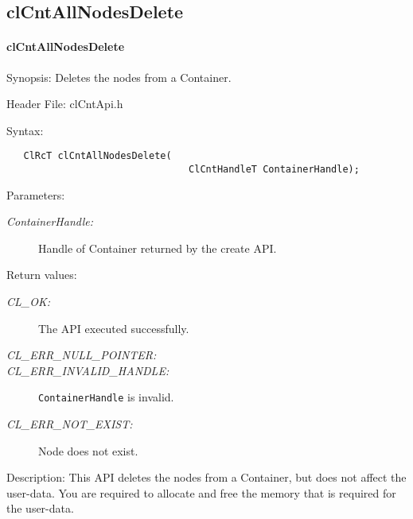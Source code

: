 \subsection{clCntAllNodesDelete}
\hypertarget{pagecnt106}{}\paragraph{cl\-Cnt\-All\-Nodes\-Delete}\label{pagecnt106}
\begin{Desc}
\item[Synopsis:]Deletes the nodes from a Container.\end{Desc}
\begin{Desc}
\item[Header File:]clCntApi.h\end{Desc}
\begin{Desc}
\item[Syntax:]

\footnotesize\begin{verbatim}   ClRcT clCntAllNodesDelete(
                        		ClCntHandleT ContainerHandle);
\end{verbatim}
\normalsize
\end{Desc}
\begin{Desc}
\item[Parameters:]
\begin{description}
\item[{\em Container\-Handle:}]Handle of Container returned by the create API.\end{description}
\end{Desc}
\begin{Desc}
\item[Return values:]
\begin{description}
\item[{\em CL\_\-OK:}]The API executed successfully. 
\item[{\em CL\_\-ERR\_\-NULL\_\-POINTER:}] 
\item[{\em CL\_\-ERR\_\-INVALID\_\-HANDLE:}] {\tt{ContainerHandle}} is invalid.
\item[{\em CL\_\-ERR\_\-NOT\_\-EXIST:}]Node does not exist.\end{description}
\end{Desc}
\begin{Desc}
\item[Description:]This API deletes the nodes from a Container, but does not affect the user-data. You are required to allocate and free the memory 
that is required for the user-data.
\end{Desc}
